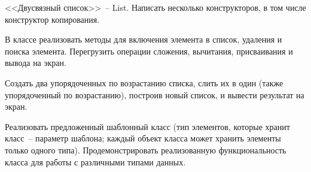 
<<Двусвязный список>>~-- List. Написать несколько конструкторов, в том числе конструктор
копирования.

В классе реализовать методы для включения элемента в список, удаления и
поиска элемента. Перегрузить операции сложения, вычитания, присваивания и вывода на
экран.

Создать два упорядоченных по возрастанию списка, слить их в один (также
упорядоченный по возрастанию), построив новый список, и вывести результат на экран.

Реализовать предложенный шаблонный класс (тип элементов, которые
хранит класс~-- параметр шаблона; каждый объект класса может хранить
элементы только одного типа). Продемонстрировать реализованную
функциональность класса для работы с различными типами данных.

